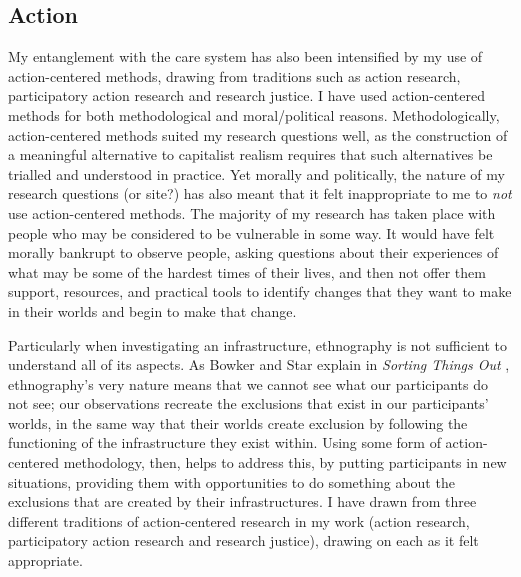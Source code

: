 
\subsection{Action}
\label{3-action}

My entanglement with the care system has also been intensified by my use of action-centered methods, drawing from traditions such as action research, participatory action research and research justice. I have used action-centered methods for both methodological and moral/political reasons. Methodologically, action-centered methods suited my research questions well, as the construction of a meaningful alternative to capitalist realism requires that such alternatives be trialled and understood in practice. Yet morally and politically, the nature of my research questions (or site?) has also meant that it felt inappropriate to me to \textit{not} use action-centered methods. The majority of my research has taken place with people who may be considered to be vulnerable in some way. It would have felt morally bankrupt to observe people, asking questions about their experiences of what may be some of the hardest times of their lives, and then not offer them support, resources, and practical tools to identify changes that they want to make in their worlds and begin to make that change.

Particularly when investigating an infrastructure, ethnography is not sufficient to understand all of its aspects. As Bowker and Star explain in \textit{Sorting Things Out} \cite{bowker_sorting_1999}, ethnography's very nature means that we cannot see what our participants do not see; our observations recreate the exclusions that exist in our participants' worlds, in the same way that their worlds create exclusion by following the functioning of the infrastructure they exist within. Using some form of action-centered methodology, then, helps to address this, by putting participants in new situations, providing them with opportunities to do something about the exclusions that are created by their infrastructures. I have drawn from three different traditions of action-centered research in my work (action research, participatory action research and research justice), drawing on each as it felt appropriate. 

